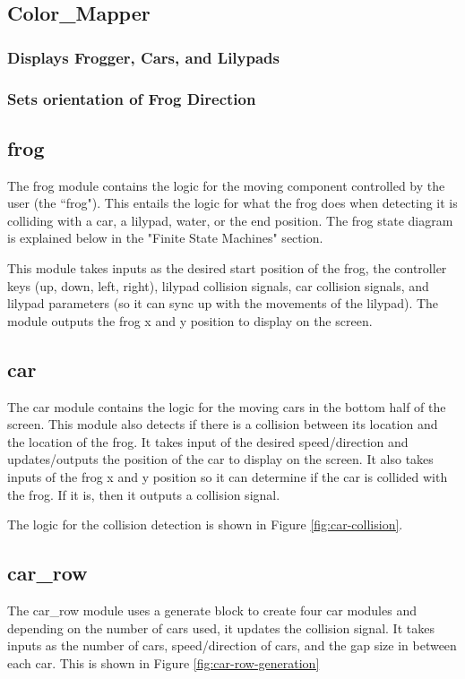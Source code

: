 \documentclass[journal, twocolumn, final,11pt,letterpaper]{IEEEtran}
\begin{document}
	\subsection{Color\_Mapper}
		\subsubsection{Displays Frogger, Cars, and Lilypads }
		\subsubsection{Sets orientation of Frog Direction}
	\subsection{frog}
	The frog module contains the logic for the moving component controlled by the user (the ``frog"). This entails the logic for what the frog does when detecting it is colliding with a car, a lilypad, water, or the end position. The frog state diagram is explained below in the "Finite State Machines" section. 
	
	This module takes inputs as the desired start position of the frog, the controller keys (up, down, left, right), lilypad collision signals, car collision signals, and lilypad parameters (so it can sync up with the movements of the lilypad). The module outputs the frog x and y position to display on the screen.
	
	\subsection{car}
	The car module contains the logic for the moving cars in the bottom half of the screen. This module also detects if there is a collision between its location and the location of the frog. It takes input of the desired speed/direction and updates/outputs the position of the car to display on the screen. It also takes inputs of the frog x and y position so it can determine if the car is collided with the frog. If it is, then it outputs a collision signal.
	
	The logic for the collision detection is shown in Figure \ref{fig:car-collision}.
	

	\subsection{car\_row}
	The car\_row module uses a generate block to create four car modules and depending on the number of cars used, it updates the collision signal. It takes inputs as the number of cars, speed/direction of cars, and the gap size in between each car. This is shown in Figure \ref{fig:car-row-generation}
	
\end{document}
